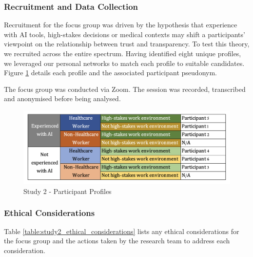 \documentclass[manuscript,screen,review]{acmart}
\begin{document}
\subsubsection{Recruitment and Data Collection}
\label{study2_recruitment_datacollection}
Recruitment for the focus group was driven by the hypothesis that experience with AI tools, high-stakes decisions or medical contexts may shift a participants' viewpoint on the relationship between trust and transparency. To test this theory, we recruited across the entire spectrum. Having identified eight unique profiles, we leveraged our personal networks to match each profile to suitable candidates. Figure \ref{fig:personality_profiles} details each profile and the associated participant pseudonym.

The focus group was conducted via Zoom. The session was recorded, transcribed and anonymised before being analysed.

\begin{figure}[h]
    \includegraphics[width=\linewidth]{graphics/personality_profiles.png}
    \caption{Study 2 - Participant Profiles}
  \label{fig:personality_profiles}
\end{figure}

\subsubsection{Ethical Considerations}
\label{study2_ethical_considerations}
 Table \ref{table:study2_ethical_considerations} lists any ethical considerations for the focus group and the actions taken by the research team to address each consideration.
\end{document}
